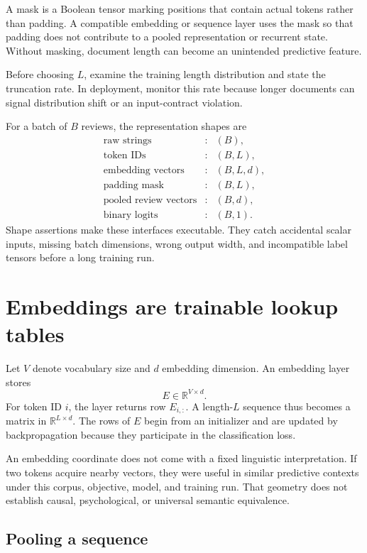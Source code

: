 A mask is a Boolean tensor marking positions that contain actual tokens rather
than padding. A compatible embedding or sequence layer uses the mask so that
padding does not contribute to a pooled representation or recurrent state.
Without masking, document length can become an unintended predictive feature.

Before choosing $L$, examine the training length distribution and state the
truncation rate. In deployment, monitor this rate because longer documents can
signal distribution shift or an input-contract violation.

For a batch of $B$ reviews, the representation shapes are
\[
\begin{array}{ccl}
\text{raw strings} &:& (B),\\
\text{token IDs} &:& (B,L),\\
\text{embedding vectors} &:& (B,L,d),\\
\text{padding mask} &:& (B,L),\\
\text{pooled review vectors} &:& (B,d),\\
\text{binary logits} &:& (B,1).
\end{array}
\]
Shape assertions make these interfaces executable. They catch accidental
scalar inputs, missing batch dimensions, wrong output width, and incompatible
label tensors before a long training run.

\section{Embeddings are trainable lookup tables}

Let $V$ denote vocabulary size and $d$ embedding dimension. An embedding layer
stores
\[
  E\in\mathbb R^{V\times d}.
\]
For token ID $i$, the layer returns row $E_{i,:}$. A length-$L$ sequence thus
becomes a matrix in $\mathbb R^{L\times d}$. The rows of $E$ begin from an
initializer and are updated by backpropagation because they participate in the
classification loss.

An embedding coordinate does not come with a fixed linguistic interpretation.
If two tokens acquire nearby vectors, they were useful in similar predictive
contexts under this corpus, objective, model, and training run. That geometry
does not establish causal, psychological, or universal semantic equivalence.

\subsection{Pooling a sequence}

